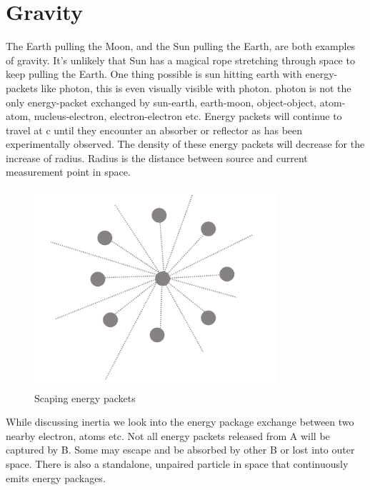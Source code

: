 \documentclass{article}
\begin{document}
    \section{Gravity}\label{sec:gravity}
    The Earth pulling the Moon, and the Sun pulling the Earth, are both examples of gravity.
    It’s unlikely that Sun has a magical rope stretching through space to keep pulling the Earth.
     One thing possible is sun hitting earth with energy-packets like photon, this is even visually visible with photon.
     photon is not the only energy-packet exchanged by sun-earth, earth-moon, object-object, atom-atom, nucleus-electron, electron-electron etc.
     Energy packets will continue to travel at c until they encounter an absorber or reflector as has been experimentally observed.
     The density of these energy packets will decrease for the increase of radius.
     Radius is the distance between source and current measurement point in space.

    \begin{figure}[H]
        \centering
        \includegraphics[width=0.8\textwidth]{images/scapping_energy_packet}
        \caption{Scaping energy packets}
        \label{fig:scaping_energy_packets}
    \end{figure}

    While discussing inertia we look into the energy package exchange between two nearby electron, atoms etc.
    Not all energy packets released from A will be captured by B. Some may escape and be absorbed by other B or lost into outer space.
    There is also a standalone, unpaired particle in space that continuously emits energy packages.
\end{document}
